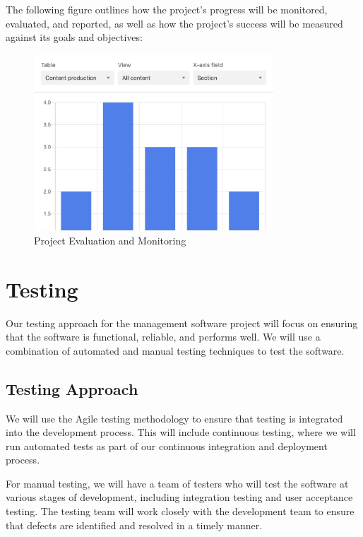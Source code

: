 \documentclass{article}
\begin{document}
The following figure outlines how the project's progress will be monitored, evaluated, and reported, as well as how the project's success will be measured against its goals and objectives:

\begin{figure}[htbp]
\centering
\includegraphics[width=0.8\textwidth]{evaluation.png}
\caption{Project Evaluation and Monitoring}
\label{fig:evaluation}
\end{figure}
\clearpage


\section{Testing}
\label{sec:testing}

Our testing approach for the management software project will focus on ensuring that the software is functional, reliable, and performs well. We will use a combination of automated and manual testing techniques to test the software.

\subsection{Testing Approach}
We will use the Agile testing methodology to ensure that testing is integrated into the development process. This will include continuous testing, where we will run automated tests as part of our continuous integration and deployment process.

For manual testing, we will have a team of testers who will test the software at various stages of development, including integration testing and user acceptance testing. The testing team will work closely with the development team to ensure that defects are identified and resolved in a timely manner.
\end{document}
